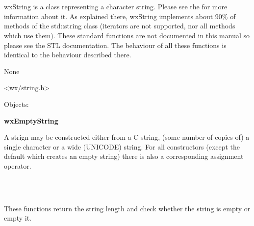 \section{}\label{wxstring}

wxString is a class representing a character string. Please see the 
 for more information about it. As explained
there, wxString implements about 90\% of methods of the std::string class (iterators
are not supported, nor all methods which use them).
These standard functions are not documented in this manual so please see the STL documentation.
The behaviour of all these functions is identical to the behaviour described
there.


None


<wx/string.h>


Objects:

{\bf wxEmptyString}





A strign may be constructed either from a C string, (some number of copies of)
a single character or a wide (UNICODE) string. For all constructors (except the
default which creates an empty string) there is also a corresponding assignment
operator.

\\
\\


These functions return the string length and check whether the string is empty
or empty it.

\\
\\
\\
\\

